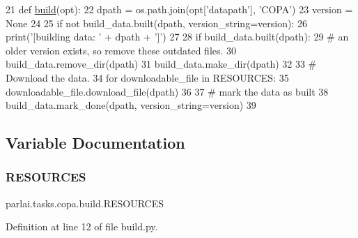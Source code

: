 \begin{DoxyCode}
21 \textcolor{keyword}{def }\hyperlink{namespacedialog__babi__feedback_1_1build_a7a9d289f7493a5ded13c4b7f071b6184}{build}(opt):
22     dpath = os.path.join(opt[\textcolor{stringliteral}{'datapath'}], \textcolor{stringliteral}{'COPA'})
23     version = \textcolor{keywordtype}{None}
24 
25     \textcolor{keywordflow}{if} \textcolor{keywordflow}{not} build\_data.built(dpath, version\_string=version):
26         print(\textcolor{stringliteral}{'[building data: '} + dpath + \textcolor{stringliteral}{']'})
27 
28         \textcolor{keywordflow}{if} build\_data.built(dpath):
29             \textcolor{comment}{# an older version exists, so remove these outdated files.}
30             build\_data.remove\_dir(dpath)
31         build\_data.make\_dir(dpath)
32 
33         \textcolor{comment}{# Download the data.}
34         \textcolor{keywordflow}{for} downloadable\_file \textcolor{keywordflow}{in} RESOURCES:
35             downloadable\_file.download\_file(dpath)
36 
37         \textcolor{comment}{# mark the data as built}
38         build\_data.mark\_done(dpath, version\_string=version)
39 \end{DoxyCode}


\subsection{Variable Documentation}
\mbox{\label{namespaceparlai_1_1tasks_1_1copa_1_1build_ad9dfd8b7ed83d50eb17b458d3c93a019}} 
\subsubsection{\texorpdfstring{R\+E\+S\+O\+U\+R\+C\+ES}{RESOURCES}}
{\footnotesize\ttfamily parlai.\+tasks.\+copa.\+build.\+R\+E\+S\+O\+U\+R\+C\+ES}



Definition at line 12 of file build.\+py.

